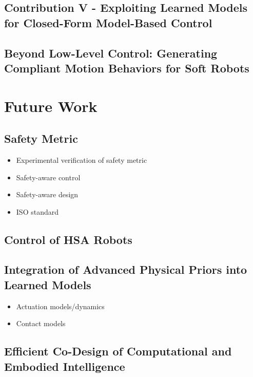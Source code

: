 \subsection{Contribution V - Exploiting Learned Models for Closed-Form Model-Based Control}

\subsection{Beyond Low-Level Control: Generating Compliant Motion Behaviors for Soft Robots}

\section{Future Work}\label{sec:future_work}

\subsection{Safety Metric}
\begin{itemize}
    \item Experimental verification of safety metric
    \item Safety-aware control
    \item Safety-aware design
    \item ISO standard
\end{itemize}

\subsection{Control of HSA Robots}

\subsection{Integration of Advanced Physical Priors into Learned Models}
\begin{itemize}
    \item Actuation models/dynamics
    \item Contact models
\end{itemize}

\subsection{Efficient Co-Design of Computational and Embodied Intelligence}